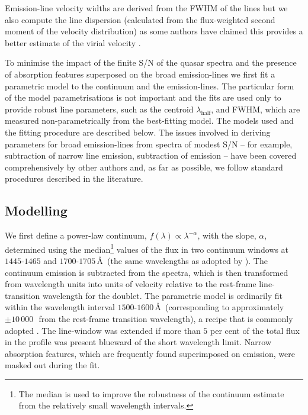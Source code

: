 Emission-line velocity widths are derived from the FWHM of the lines but we also compute the line dispersion (calculated from the flux-weighted second moment of the velocity distribution) as some authors have claimed this provides a better estimate of the virial velocity \citep{denney13}. 

To minimise the impact of the finite S/N of the quasar spectra and the presence of absorption features superposed on the broad emission-lines we first fit a parametric model to the continuum and the emission-lines. 
The particular form of the model parametrisations is not important and the fits are used only to provide robust line parameters, such as the centroid $\lambda_{\text{half}}$, and FWHM, which are measured non-parametrically from the best-fitting model. 
The models used and the fitting procedure are described below. 
The issues involved in deriving parameters for broad emission-lines from spectra of modest S/N -- for example, subtraction of narrow line emission, subtraction of  emission -- have been covered comprehensively by other authors \citep[e.g.][]{shen11,shen12,denney13,shen16a} and, as far as possible, we follow standard procedures described in the literature. 

\subsection{Modelling }
\label{sec:civ}

We first define a power-law continuum, $f(\lambda) \propto \lambda^{-\alpha}$, with the slope, $\alpha$, determined using the median\footnote{The median is used to improve the robustness of the continuum estimate from the relatively small wavelength intervals.} values of the flux in two continuum windows at $1445$-$1465$ and $1700$-$1705$\,\AA\, (the same wavelengths as adopted by \citealt{shen11}). 
The continuum emission is subtracted from the spectra, which is then transformed from wavelength units into units of velocity relative to the rest-frame line-transition wavelength for the  doublet.
The parametric model is ordinarily fit within the wavelength interval $1500$-$1600$\,\AA\, (corresponding to approximately $\pm 10\,000$\,\kms\, from the rest-frame transition wavelength), a recipe that is commonly adopted \citep[e.g.][]{shen11,denney13}. 
The line-window was extended if more than $5$ per cent of the total flux in the profile was present blueward of the short wavelength limit. 
Narrow absorption features, which are frequently found superimposed on  emission, were masked out during the fit. 

